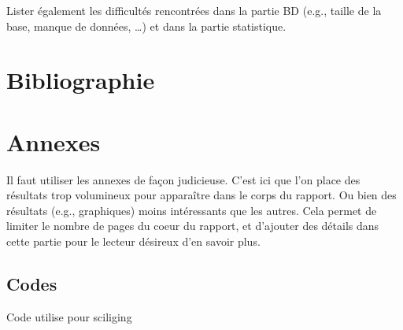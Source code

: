\documentclass[mstat,12pt]{unswthesis}
\begin{document}
\bigskip

Lister également les difficultés rencontrées dans la partie BD (e.g.,
taille de la base, manque de données, \ldots) et dans la partie
statistique.

\chapter*{Bibliographie}\label{bibliographie}

\label{refs}
\begin{CSLReferences}{0}{1}
\end{CSLReferences}




\chapter*{Annexes}\label{annexes}

Il faut utiliser les annexes de façon judicieuse. C'est ici que l'on
place des résultats trop volumineux pour apparaître dans le corps du
rapport. Ou bien des résultats (e.g., graphiques) moins intéressants que
les autres. Cela permet de limiter le nombre de pages du coeur du
rapport, et d'ajouter des détails dans cette partie pour le lecteur
désireux d'en savoir plus.

\section*{\texorpdfstring{\textbf{Codes}}{Codes}}\label{codes}

\tiny

Code utilise pour sciliging \label{codeR_slicing}
\end{document}
